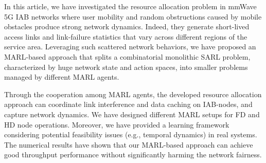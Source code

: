 In this article, we have investigated the resource allocation problem in mmWave 5G IAB networks where user mobility and random obstructions caused by mobile obstacles produce strong network dynamics. Indeed, they generate short-lived access links and link-failure statistics that vary across different regions of the service area. Leveraging such scattered network behaviors, we have proposed an MARL-based approach that splits a combinatorial monolithic SARL problem, characterized by huge network state and action spaces, into smaller problems managed by different MARL agents.


Through the cooperation among MARL agents, the developed resource allocation approach can coordinate link interference and data caching on IAB-nodes, and capture network dynamics. We have designed different MARL setups for FD and HD node operations. Moreover, we have provided a learning framework considering potential feasibility issues (e.g., temporal dynamics) in real systems. The numerical results have shown that our MARL-based approach can achieve good throughput performance without significantly harming the network fairness.

